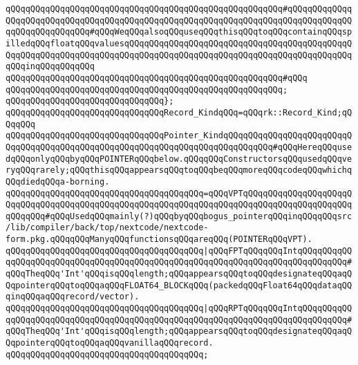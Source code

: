 \verb|qQQqqQQqqQQqqQQqqQQqqQQqqQQqqQQqqQQqqQQqqQQqqQQqqQQqqQQq#qQQqqQQqqQQqqQQqqQQqqQQqqQQqqQQqqQQqqQQqqQQqqQQqqQQqqQQqqQQqqQQqqQQqqQQqqQQqqQQqqQQqqQQqqQQqqQQqqQQq#qQQqWeqQQqalsoqQQquseqQQqthisqQQqtoqQQqcontainqQQqspilledqQQqfloatqQQqvaluesqQQqqQQqqQQqqQQqqQQqqQQqqQQqqQQqqQQqqQQqqQQqqQQqqQQqqQQqqQQqqQQqqQQqqQQqqQQqqQQqqQQqqQQqqQQqqQQqqQQqqQQqqQQqqQQqqQQqqQQqinqQQqqQQqqQQq|\newline
\verb|qQQqqQQqqQQqqQQqqQQqqQQqqQQqqQQqqQQqqQQqqQQqqQQqqQQqqQQq#qQQq|\newline
\verb|qQQqqQQqqQQqqQQqqQQqqQQqqQQqqQQqqQQqqQQqqQQqqQQqqQQqqQQq;|\newline
\verb|qQQqqQQqqQQqqQQqqQQqqQQqqQQqqQQq};|\newline
\newline
\verb|qQQqqQQqqQQqqQQqqQQqqQQqqQQqqQQqRecord_KindqQQq=qQQqrk::Record_Kind;qQQqqQQq|\newline
\newline
\verb|qQQqqQQqqQQqqQQqqQQqqQQqqQQqqQQqPointer_KindqQQqqQQqqQQqqQQqqQQqqQQqqQQqqQQqqQQqqQQqqQQqqQQqqQQqqQQqqQQqqQQqqQQqqQQqqQQqqQQq#qQQqHereqQQqusedqQQqonlyqQQqbyqQQqPOINTERqQQqbelow.qQQqqQQqConstructorsqQQqusedqQQqveryqQQqrarely;qQQqthisqQQqappearsqQQqtoqQQqbeqQQqmoreqQQqcodeqQQqwhichqQQqdiedqQQqa-borning.|\newline
\verb|qQQqqQQqqQQqqQQqqQQqqQQqqQQqqQQqqQQqqQQq=qQQqVPTqQQqqQQqqQQqqQQqqQQqqQQqqQQqqQQqqQQqqQQqqQQqqQQqqQQqqQQqqQQqqQQqqQQqqQQqqQQqqQQqqQQqqQQqqQQqqQQqqQQq#qQQqUsedqQQqmainly(?)qQQqbyqQQqbogus_pointerqQQqinqQQqqQQqsrc/lib/compiler/back/top/nextcode/nextcode-form.pkg.qQQqqQQqManyqQQqfunctionsqQQqareqQQq(POINTERqQQqVPT).|\newline
\verb|qQQqqQQqqQQqqQQqqQQqqQQqqQQqqQQqqQQqqQQq|\verb#|qQQqFPTqQQqqQQqIntqQQqqQQqqQQqqQQqqQQqqQQqqQQqqQQqqQQqqQQqqQQqqQQqqQQqqQQqqQQqqQQqqQQqqQQqqQQqqQQq#\verb|#qQQqTheqQQq'Int'qQQqisqQQqlength;qQQqappearsqQQqtoqQQqdesignateqQQqaqQQqpointerqQQqtoqQQqaqQQqFLOAT64_BLOCKqQQq(packedqQQqFloat64qQQqdataqQQqinqQQqaqQQqrecord/vector).|\newline
\verb|qQQqqQQqqQQqqQQqqQQqqQQqqQQqqQQqqQQqqQQq|\verb#|qQQqRPTqQQqqQQqIntqQQqqQQqqQQqqQQqqQQqqQQqqQQqqQQqqQQqqQQqqQQqqQQqqQQqqQQqqQQqqQQqqQQqqQQqqQQqqQQq#\verb|#qQQqTheqQQq'Int'qQQqisqQQqlength;qQQqappearsqQQqtoqQQqdesignateqQQqaqQQqpointerqQQqtoqQQqaqQQqvanillaqQQqrecord.|\newline
\verb|qQQqqQQqqQQqqQQqqQQqqQQqqQQqqQQqqQQqqQQq;|\newline
